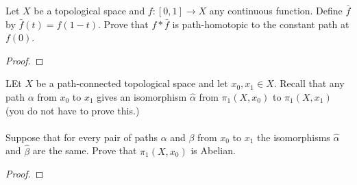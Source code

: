 \begin{problem}
Let $X$ be a topological space and $f\colon[0,1]\to X$ any
continuous function. Define $\bar f$ by $\bar f(t)=f(1-t)$. Prove
that $f*\bar f$ is path-homotopic to the constant path at $f(0)$.
\end{problem}
\begin{proof}
\end{proof}
\begin{problem}
LEt $X$ be a path-connected topological space and let $x_0,x_1\in
X$. Recall that any path $\alpha$ from $x_0$ to $x_1$  gives an
isomorphism $\hat\alpha$ from $\pi_1(X,x_0)$ to $\pi_1(X,x_1)$
(you do not have to prove this.)
\\\\
Suppose that for every pair of paths $\alpha$ and $\beta$ from
$x_0$ to $x_1$ the isomorphisms $\hat\alpha$ and $\hat\beta$  are
the same. Prove that $\pi_1(X,x_0)$ is Abelian.
\end{problem}
\begin{proof}
\end{proof}

